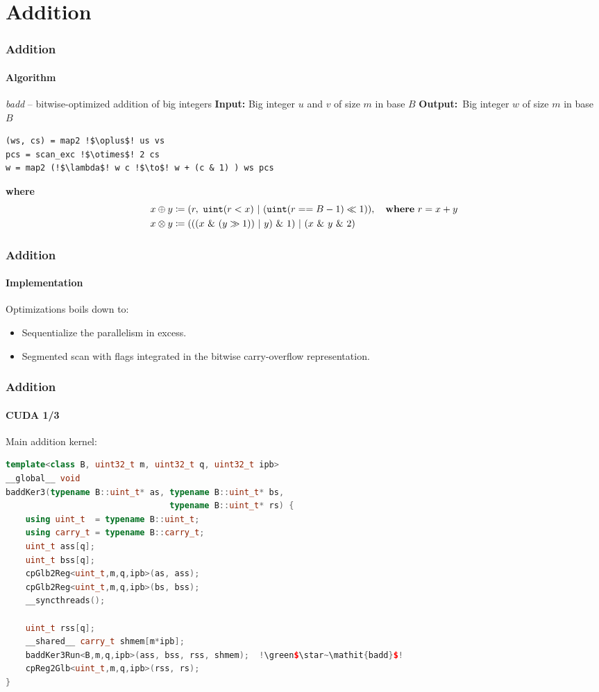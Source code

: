 \section{Addition}
\begin{frame}[fragile]
  \frametitle{Addition}
  \framesubtitle{Algorithm}
  \begin{block}{\textit{badd} -- bitwise-optimized addition of big integers}\scriptsize
    \textbf{Input:} \quad Big integer $u$ and $v$ of size $m$ in base $B$\newline
    \textbf{Output:} \,Big integer $w$ of size $m$ in base $B$\newline
\begin{lstlisting}[language=pseudo,escapeinside=!!,basicstyle=\scriptsize]
(ws, cs) = map2 !$\oplus$! us vs
pcs = scan_exc !$\otimes$! 2 cs
w = map2 (!$\lambda$! w c !$\to$! w + (c & 1) ) ws pcs
\end{lstlisting}\phantom{~}\newline
    \textbf{where}\vspace*{-0.5em}
    \begin{align}
  x \oplus y &\coloneq (r,~\mathtt{uint}(r < x)~|~(\mathtt{uint}(r == B-1) \ll 1)),\quad\textbf{where}~r = x + y \\
  x \otimes y &\coloneq (((x~\&~(y \gg 1))~|~y)~\&~1)~|~(x~\&~y~\&~2)
      \end{align}
  \end{block}
\end{frame}

\begin{frame}[fragile]
  \frametitle{Addition}
  \framesubtitle{Implementation}
  Optimizations boils down to:
  \begin{itemize}
    \item Sequentialize the parallelism in excess.
    \item Segmented scan with flags integrated in the bitwise carry-overflow representation.
    \end{itemize}
\end{frame}

\begin{frame}[fragile]
  \frametitle{Addition}
  \framesubtitle{CUDA 1/3}
  Main addition kernel:
\begin{lstlisting}[language=CPP,gobble=0,basicstyle=\scriptsize,escapeinside=!!,frame=single]
template<class B, uint32_t m, uint32_t q, uint32_t ipb>
__global__ void
baddKer3(typename B::uint_t* as, typename B::uint_t* bs,
                                 typename B::uint_t* rs) {
    using uint_t  = typename B::uint_t;
    using carry_t = typename B::carry_t;
    uint_t ass[q];
    uint_t bss[q];
    cpGlb2Reg<uint_t,m,q,ipb>(as, ass);
    cpGlb2Reg<uint_t,m,q,ipb>(bs, bss);
    __syncthreads();

    uint_t rss[q];
    __shared__ carry_t shmem[m*ipb];
    baddKer3Run<B,m,q,ipb>(ass, bss, rss, shmem);  !\green$\star~\mathit{badd}$!
    cpReg2Glb<uint_t,m,q,ipb>(rss, rs);
}
\end{lstlisting}
\end{frame}

